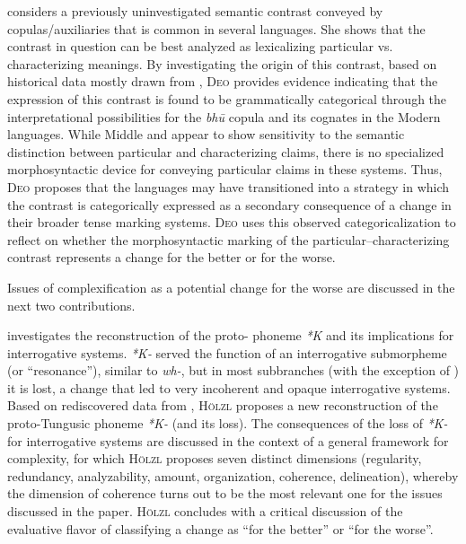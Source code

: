 \documentclass[output=paper,hidelinks]{langscibook}
\begin{document}
\textsc{} considers a previously uninvestigated semantic contrast conveyed by copulas/auxiliaries that is common in several  languages. She shows that the contrast in question can be best analyzed as lexicalizing particular vs. characterizing meanings. By investigating the origin of this contrast, based on historical data mostly drawn from , \textsc{Deo} provides evidence indicating that the expression of this contrast is found to be grammatically categorical through the interpretational possibilities for the \textit{bh\={u}} copula and its cognates in the Modern  languages.  While Middle and  appear to show sensitivity to the semantic distinction between particular and characterizing claims, there is no specialized morphosyntactic device for conveying particular claims in these systems. Thus, \textsc{Deo} proposes that the  languages may have transitioned into a strategy in which the contrast is categorically expressed as a secondary consequence of a change in their broader tense marking systems. \textsc{Deo} uses this observed categoricalization to reflect on whether the morphosyntactic marking of the particular–characterizing contrast represents a change for the better or for the worse.

Issues of complexification as a potential change for the worse are discussed in the next two contributions.

\textsc{} investigates the reconstruction of the proto- pho\-neme \textit{*K} and its implications for  interrogative systems. \textit{*K-} served the function of an interrogative submorpheme (or ``resonance''), similar to  \textit{wh-}, but in most  subbranches (with the exception of ) it is lost, a change that led to very incoherent and opaque interrogative systems. Based on rediscovered data from , \textsc{Hölzl} proposes a new reconstruction of the proto-Tungusic phoneme \textit{*K-} (and its loss). The consequences of the loss of \textit{*K-} for interrogative systems are discussed in the context of a general framework for complexity, for which \textsc{Hölzl} proposes seven distinct dimensions (regularity, redundancy, analyzability, amount, organization, coherence, delineation), whereby the dimension of coherence turns out to be the most relevant one for the issues discussed in the paper. \textsc{Hölzl} concludes with a critical discussion of the evaluative flavor of classifying a change as ``for the better'' or ``for the worse''.
\end{document}
